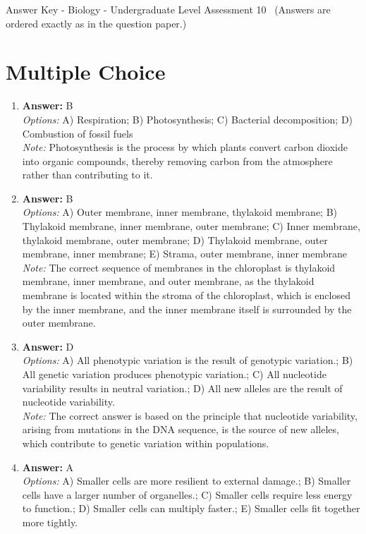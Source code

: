 \documentclass[12pt]{article}
\begin{document}
\begin{center}
Answer Key - Biology - Undergraduate Level Assessment 10 \
\small (Answers are ordered exactly as in the question paper.)
\end{center}

\section*{Multiple Choice}
\begin{enumerate}[label=\arabic*.]
\item \textbf{Answer:} B
\\ \textit{Options:} A) Respiration; B) Photosynthesis; C) Bacterial decomposition; D) Combustion of fossil fuels
\\ \textit{Note:} Photosynthesis is the process by which plants convert carbon dioxide into organic compounds, thereby removing carbon from the atmosphere rather than contributing to it.
\item \textbf{Answer:} B
\\ \textit{Options:} A) Outer membrane, inner membrane, thylakoid membrane; B) Thylakoid membrane, inner membrane, outer membrane; C) Inner membrane, thylakoid membrane, outer membrane; D) Thylakoid membrane, outer membrane, inner membrane; E) Strama, outer membrane, inner membrane
\\ \textit{Note:} The correct sequence of membranes in the chloroplast is thylakoid membrane, inner membrane, and outer membrane, as the thylakoid membrane is located within the stroma of the chloroplast, which is enclosed by the inner membrane, and the inner membrane itself is surrounded by the outer membrane.
\item \textbf{Answer:} D
\\ \textit{Options:} A) All phenotypic variation is the result of genotypic variation.; B) All genetic variation produces phenotypic variation.; C) All nucleotide variability results in neutral variation.; D) All new alleles are the result of nucleotide variability.
\\ \textit{Note:} The correct answer is based on the principle that nucleotide variability, arising from mutations in the DNA sequence, is the source of new alleles, which contribute to genetic variation within populations.
\item \textbf{Answer:} A
\\ \textit{Options:} A) Smaller cells are more resilient to external damage.; B) Smaller cells have a larger number of organelles.; C) Smaller cells require less energy to function.; D) Smaller cells can multiply faster.; E) Smaller cells fit together more tightly.

\end{enumerate}
\end{document}
